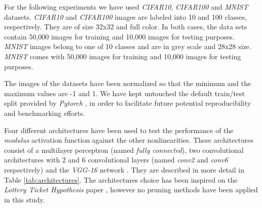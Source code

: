 \documentclass[authoryear]{elsarticle}
\begin{document}
For the following experiments we have used \textit{CIFAR10}, \textit{CIFAR100} \citep{krizhevsky09} and \textit{MNIST} \citep{lecun2010} datasets. \textit{CIFAR10} and \textit{CIFAR100} images are labeled into 10 and 100 classes, respectively. They are of size 32x32 and full color. In both cases, the data sets contain 50,000 images for training and 10,000 images for testing purposes. \textit{MNIST} images belong to one of 10 classes and are in grey scale and 28x28 size. \textit{MNIST} comes with 50,000 images for training and 10,000 images for testing purposes.

The images of the datasets have been normalized so that the minimum and the maximum values are -1 and 1. We have kept untouched the default train/test split provided by \textit{Pytorch} \citep{Paszke2019}, in order to facilitate future potential reproducibility and benchmarking efforts. 

Four different architectures have been used to test the performance of the \textit{modulus} activation function against the other nonlinearities. These architectures consist of a multilayer perceptron (named \textit{fully connected}), two convolutional architectures with 2 and 6 convolutional layers (named \textit{conv2} and \textit{conv6} respectively) and the \textit{VGG-16} network \cite{simonyan2015}. They are described in more detail in Table \ref{tab:architectures}. The architectures choice has been inspired on the \textit{Lottery Ticket Hypothesis} paper \citep{frankleC19}, however no pruning methods have been applied in this study.



\end{document}
